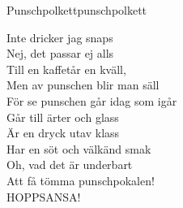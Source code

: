 \begin{song}{Punschpolkett}{punschpolkett}
\begin{vers}
Inte dricker jag snaps\\
Nej, det passar ej alls\\
Till en kaffetår en kväll, \\
Men av punschen blir man säll\\
För se punschen går idag som igår\\
Går till ärter och glass\\
Är en dryck utav klass\\
Har en söt och välkänd smak\\
Oh, vad det är underbart\\
Att få tömma punschpokalen!\\
HOPPSANSA!\\
\end{vers}
\end{song}
